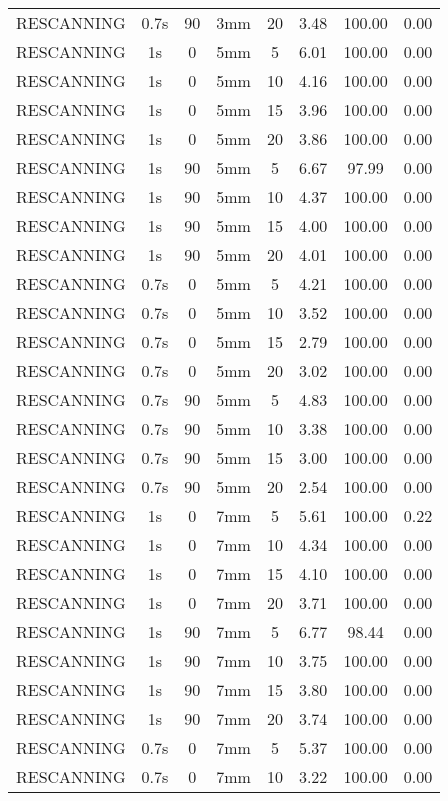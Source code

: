\begin{table}[H]
\begin{tabular}{|c||c|c|c|c||c|c|c|}
RESCANNING & 0.7s & 90 & 3mm & 20 & 3.48 & 100.00 & 0.00 \\
RESCANNING & 1s & 0 & 5mm & 5 & 6.01 & 100.00 & 0.00 \\
RESCANNING & 1s & 0 & 5mm & 10 & 4.16 & 100.00 & 0.00 \\
RESCANNING & 1s & 0 & 5mm & 15 & 3.96 & 100.00 & 0.00 \\
RESCANNING & 1s & 0 & 5mm & 20 & 3.86 & 100.00 & 0.00 \\
RESCANNING & 1s & 90 & 5mm & 5 & 6.67 & 97.99 & 0.00 \\
RESCANNING & 1s & 90 & 5mm & 10 & 4.37 & 100.00 & 0.00 \\
RESCANNING & 1s & 90 & 5mm & 15 & 4.00 & 100.00 & 0.00 \\
RESCANNING & 1s & 90 & 5mm & 20 & 4.01 & 100.00 & 0.00 \\
RESCANNING & 0.7s & 0 & 5mm & 5 & 4.21 & 100.00 & 0.00 \\
RESCANNING & 0.7s & 0 & 5mm & 10 & 3.52 & 100.00 & 0.00 \\
RESCANNING & 0.7s & 0 & 5mm & 15 & 2.79 & 100.00 & 0.00 \\
RESCANNING & 0.7s & 0 & 5mm & 20 & 3.02 & 100.00 & 0.00 \\
RESCANNING & 0.7s & 90 & 5mm & 5 & 4.83 & 100.00 & 0.00 \\
RESCANNING & 0.7s & 90 & 5mm & 10 & 3.38 & 100.00 & 0.00 \\
RESCANNING & 0.7s & 90 & 5mm & 15 & 3.00 & 100.00 & 0.00 \\
RESCANNING & 0.7s & 90 & 5mm & 20 & 2.54 & 100.00 & 0.00 \\
RESCANNING & 1s & 0 & 7mm & 5 & 5.61 & 100.00 & 0.22 \\
RESCANNING & 1s & 0 & 7mm & 10 & 4.34 & 100.00 & 0.00 \\
RESCANNING & 1s & 0 & 7mm & 15 & 4.10 & 100.00 & 0.00 \\
RESCANNING & 1s & 0 & 7mm & 20 & 3.71 & 100.00 & 0.00 \\
RESCANNING & 1s & 90 & 7mm & 5 & 6.77 & 98.44 & 0.00 \\
RESCANNING & 1s & 90 & 7mm & 10 & 3.75 & 100.00 & 0.00 \\
RESCANNING & 1s & 90 & 7mm & 15 & 3.80 & 100.00 & 0.00 \\
RESCANNING & 1s & 90 & 7mm & 20 & 3.74 & 100.00 & 0.00 \\
RESCANNING & 0.7s & 0 & 7mm & 5 & 5.37 & 100.00 & 0.00 \\
RESCANNING & 0.7s & 0 & 7mm & 10 & 3.22 & 100.00 & 0.00 \\

\end{tabular}
\end{table}
